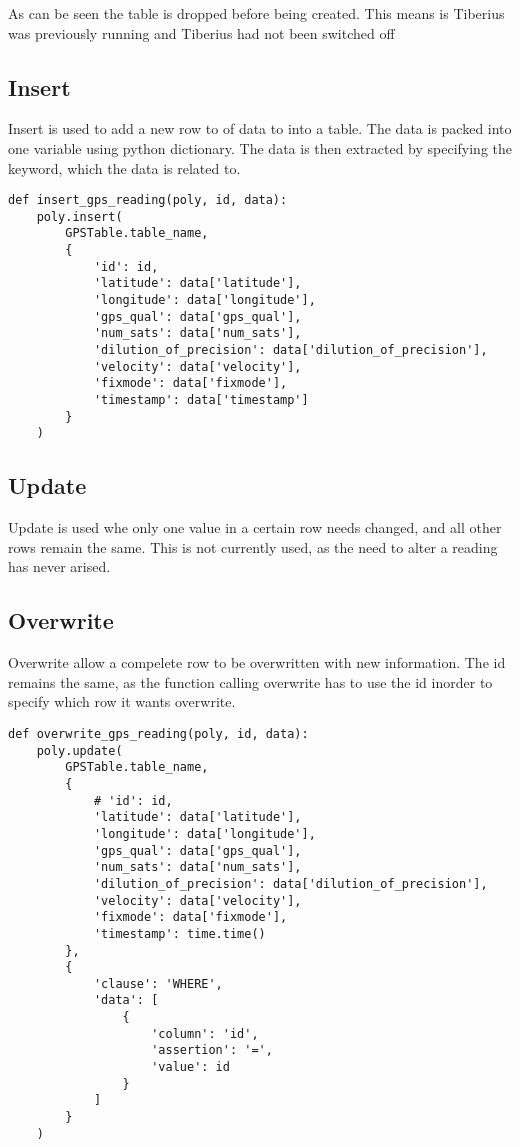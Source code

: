 As can be seen the table is dropped before being created. This means is Tiberius was previously running and Tiberius had not been switched off

\subsection{Insert}
Insert is used to add a new row to of data to into a table. The data is packed into one variable using python dictionary. The data is then extracted by specifying the keyword, which the data is related to.  

\begin{lstlisting}[style=custompython]
def insert_gps_reading(poly, id, data):
    poly.insert(
        GPSTable.table_name,
        {
            'id': id,
            'latitude': data['latitude'],
            'longitude': data['longitude'],
            'gps_qual': data['gps_qual'],
            'num_sats': data['num_sats'],
            'dilution_of_precision': data['dilution_of_precision'],
            'velocity': data['velocity'],
            'fixmode': data['fixmode'],
            'timestamp': data['timestamp']
        }
    )
\end{lstlisting}

\subsection{Update}
Update is used whe only one value in a certain row needs changed, and all other rows remain the same. This is not currently used, as the need to alter a reading has never arised. 

\subsection{Overwrite}
Overwrite allow a compelete row to be overwritten with new information. The id remains the same, as the function calling overwrite has to use the id inorder to specify which row it wants overwrite.

\begin{lstlisting}[style=custompython]
def overwrite_gps_reading(poly, id, data):
    poly.update(
        GPSTable.table_name,
        {
            # 'id': id,
            'latitude': data['latitude'],
            'longitude': data['longitude'],
            'gps_qual': data['gps_qual'],
            'num_sats': data['num_sats'],
            'dilution_of_precision': data['dilution_of_precision'],
            'velocity': data['velocity'],
            'fixmode': data['fixmode'],
            'timestamp': time.time()
        },
        {
            'clause': 'WHERE',
            'data': [
                {
                    'column': 'id',
                    'assertion': '=',
                    'value': id
                }
            ]
        }
    )
\end{lstlisting}

